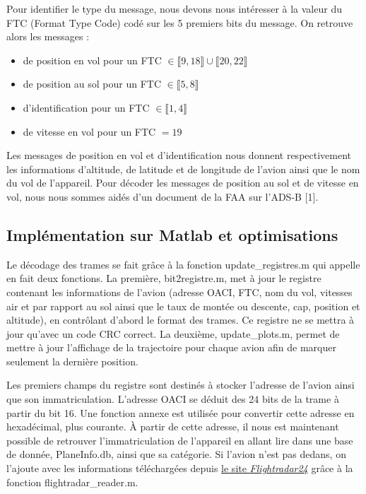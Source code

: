 \documentclass[a4paper, 10pt]{article}
\begin{document}
    \vspace{5pt}
    Pour identifier le type du message, nous devons nous intéresser à la valeur du FTC (Format Type Code) codé sur les 5 premiers bits du message. On retrouve alors les messages :
    \begin{itemize}
        \item de position en vol pour un FTC $\in \llbracket 9, 18 \rrbracket \cup \llbracket 20, 22 \rrbracket$
        \item de position au sol pour un FTC $\in \llbracket 5,8 \rrbracket$
        \item d'identification pour un FTC $\in \llbracket 1,4 \rrbracket$
        \item de vitesse en vol pour un FTC $= 19$
    \end{itemize}
    
    \vspace{5pt}
    Les messages de position en vol et d'identification nous donnent respectivement les informations d'altitude, de latitude et de longitude de l'avion ainsi que le nom du vol de l'appareil.
    Pour décoder les messages de position au sol et de vitesse en vol, nous nous sommes aidés d'un document de la FAA sur l'ADS-B [1].
    
    \subsection{Implémentation sur Matlab et optimisations}
    \noindent
    
    Le décodage des trames se fait grâce à la fonction {update\_registres.m} qui appelle en fait deux fonctions. La première, \textsf{bit2registre.m}, met à jour le registre contenant les informations de l'avion (adresse OACI, FTC, nom du vol, vitesses air et par rapport au sol ainsi que le taux de montée ou descente, cap, position et altitude), en contrôlant d'abord le format des trames. Ce registre ne se mettra à jour qu'avec un code CRC correct. La deuxième, \textsf{update\_plots.m}, permet de mettre à jour l'affichage de la trajectoire pour chaque avion afin de marquer seulement la dernière position.
    
    \vspace{10pt}
    
    Les premiers champs du registre sont destinés à stocker l'adresse de l'avion ainsi que son immatriculation. L'adresse OACI se déduit des 24 bits de la trame à partir du bit 16. Une fonction annexe est utilisée pour convertir cette adresse en hexadécimal, plus courante. À partir de cette adresse, il nous est maintenant possible de retrouver l'immatriculation de l'appareil en allant lire dans une base de donnée, \textsf{PlaneInfo.db}, ainsi que sa catégorie. Si l'avion n'est pas dedans, on l'ajoute avec les informations téléchargées depuis \href{http://flightradar24.com}{le site \textit{Flightradar24}} grâce à la fonction \textsf{flightradar\_reader.m}.
    
\end{document}
